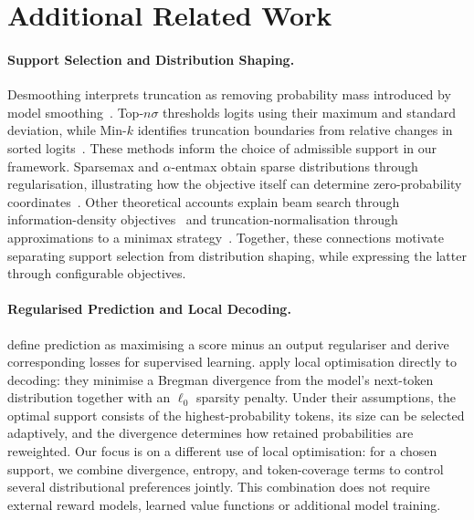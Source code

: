 \documentclass{article} %
\begin{document}
\clearpage
\appendix

\section{Additional Related Work}
\label{app:related_work}

\paragraph{Support Selection and Distribution Shaping.}
Desmoothing interprets truncation as removing probability mass introduced by model smoothing~\citep{hewitt2022truncation}.
Top-$n\sigma$ thresholds logits using their maximum and standard deviation, while Min-$k$ identifies truncation boundaries from relative changes in sorted logits~\citep{tang2025topnsigma,ding2026mink}.
These methods inform the choice of admissible support in our framework.
Sparsemax and $\alpha$-entmax obtain sparse distributions through regularisation, illustrating how the objective itself can determine zero-probability coordinates~\citep{martins2016softmax,peters2019sparse}.
Other theoretical accounts explain beam search through information-density objectives~\citep{meister2020if} and truncation-normalisation through approximations to a minimax strategy~\citep{chen2025decodinggame}.
Together, these connections motivate separating support selection from distribution shaping, while expressing the latter through configurable objectives.

\paragraph{Regularised Prediction and Local Decoding.}
\citet{blondel2020fenchel} define prediction as maximising a score minus an output regulariser and derive corresponding losses for supervised learning.
\citet{noarov2025foundations} apply local optimisation directly to decoding: they minimise a Bregman divergence from the model's next-token distribution together with an $\ell_0$ sparsity penalty.
Under their assumptions, the optimal support consists of the highest-probability tokens, its size can be selected adaptively, and the divergence determines how retained probabilities are reweighted.
Our focus is on a different use of local optimisation: for a chosen support, we combine divergence, entropy, and token-coverage terms to control several distributional preferences jointly.
This combination does not require external reward models, learned value functions or additional model training.
\end{document}
